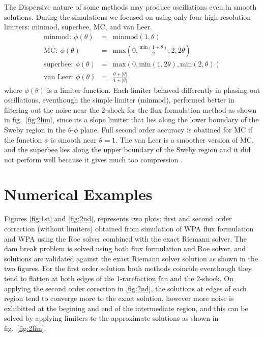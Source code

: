 \documentclass[12pt,a4paper]{article}
\begin{document}
	\noindent The Dispersive nature of some methods may produce oscillations even in smooth solutions. During the simulations we focused on using only  four high-resolution limiters: minmod, superbee, MC, and van Leer.
	\begin{eqnarray}
		\text{minmod} :~ \phi(\theta) &=& \text{minmod}(1,\theta)\\
		\text{MC} : ~ \phi(\theta) &=& \text{max} \left(0,\frac{\text{min}(1 + \theta)}{2},2,2\theta \right)\\
		\text{superbee}: ~ \phi(\theta) &=& \text{max}(0,\text{min}(1,2\theta),\text{min}(2,\theta))\\
		\text{van Leer} : ~ \phi(\theta) &=& \frac{\theta + |\theta|}{1 + |\theta|}
	\end{eqnarray}
	\noindent where $\phi(\theta)$ is a limiter function. Each limiter behaved differently in phasing out oscillations, eventhough the simple limiter (minmod), performed better  in filtering out the noise near the 2-shock for the flux formulation method as shown in fig.~\ref*{fig:2lim}, since its a slope limiter that lies along the lower boundary of the Sweby region in the $\theta$-$\phi$  plane. Full second order accuracy is obatined for MC if the function $\phi$ is smooth near $\theta=1$. The van Leer is a smoother version of MC, and the superbee lies along the upper boundary of the Sweby region and it did not perform well because it gives much too compression  \cite{ma-ah-be-ca-ge-ha-ke-le-le:2016}.\\
	\section{Numerical Examples}
	
	Figures \ref{fig:1st} and  \ref{fig:2nd}, represents two plots: first  and second order correction (without limiters) obtained from simulation of WPA flux formulation and WPA using the Roe solver combined with the exact Riemann solver. The dam break problem is solved using both flux formulation and  Roe solver, and  solutions are validated against the exact Riemann solver solution as shown in the two figures. For the first order solution both methods coincide eventhough they tend to flatten at both edges of the 1-rarefaction fan and the 2-shock. On applying the second order corection in  \ref{fig:2nd}, the solutions at edges of each region tend to converge more to the exact solution, however more noise is exhibitted at the begining and end of the intermediate region, and this can be solved by applying limiters to the approximate solutions as shown in fig.~\ref{fig:2lim}. 
	
\end{document}
